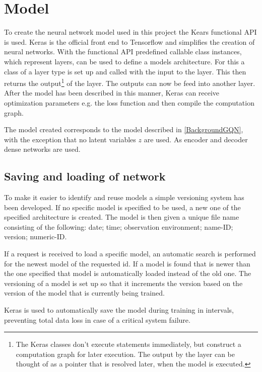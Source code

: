 \section{Model}
To create the neural network model used in this project the Kears functional API is used. Keras is the official front end to Tensorflow and simplifies the creation of neural networks. With the functional API predefined callable class instances, which represent layers, can be used to define a models architecture. For this a class of a layer type is set up and called with the input to the layer. This then returns the output\footnote{The Keras classes don't execute statements immediately, but construct a computation graph for later execution. The output by the layer can be thought of as a pointer that is resolved later, when the model is executed.} of the layer. The outputs can now be feed into another layer. After the model has been described in this manner, Keras can receive optimization parameters e.g. the loss function and then compile the computation graph.

The model created corresponds to the model described in \cref{BackgroundGQN}, with the exception that no latent variables $z$ are used. As encoder and decoder dense networks are used.


\subsection{Saving and loading of network}
To make it easier to identify and reuse models a simple versioning system has been developed. If no specific model is specified to be used, a new one of the specified architecture is created. The model is then given a unique file name consisting of the following: date; time; observation environment; name-ID; version; numeric-ID.

If a request is received to load a specific model, an automatic search is performed for the newest model of the requested id. If a model is found that is newer than the one specified that model is automatically loaded instead of the old one. The versioning of a model is set up so that it increments the version based on the version of the model that is currently being trained.

Keras is used to automatically save the model during training in intervals, preventing total data loss in case of a critical system failure.


